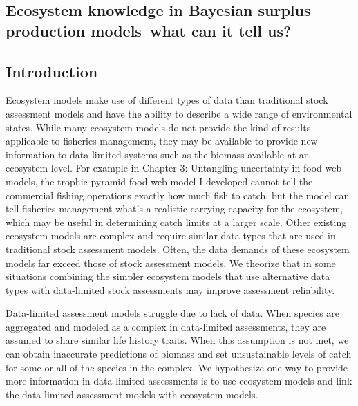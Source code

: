 \documentclass[oneside,12pt,final]{sty/ucthesis-CA2012}
\begin{document}
\begin{mainmatter}
\chapter{Ecosystem knowledge in Bayesian surplus production models--what can it tell us?}

\section*{Introduction}
Ecosystem models make use of different types of data than traditional stock assessment models and have the ability to describe a wide range of environmental states. While many ecosystem models do not provide the kind of results applicable to fisheries management, they may be available to provide new information to data-limited systems such as the biomass available at an ecosystem-level. For example in Chapter 3: Untangling uncertainty in food web models, the trophic pyramid food web model I developed cannot tell the commercial fishing operations exactly how much fish to catch, but the model can tell fisheries management what's a realistic carrying capacity for the ecosystem, which may be useful in determining catch limits at a larger scale. Other existing ecosystem models are complex and require similar data types that are used in traditional stock assessment models. Often, the data demands of these ecosystem models far exceed those of stock assessment models. We theorize that in some situations combining the simpler ecosystem models that use alternative data types with data-limited stock assessments may improve assessment reliability. 

\vspace{5mm}

Data-limited assessment models struggle due to lack of data. When species are aggregated and modeled as a complex in data-limited assessments, they are assumed to share similar life history traits. When this assumption is not met, we can obtain inaccurate predictions of biomass and set unsustainable levels of catch for some or all of the species in the complex. We hypothesize one way to provide more information in data-limited assessments is to use ecosystem models and link the data-limited assessment models with ecosystem models. 

\vspace{5mm}


\end{mainmatter}
\end{document}
